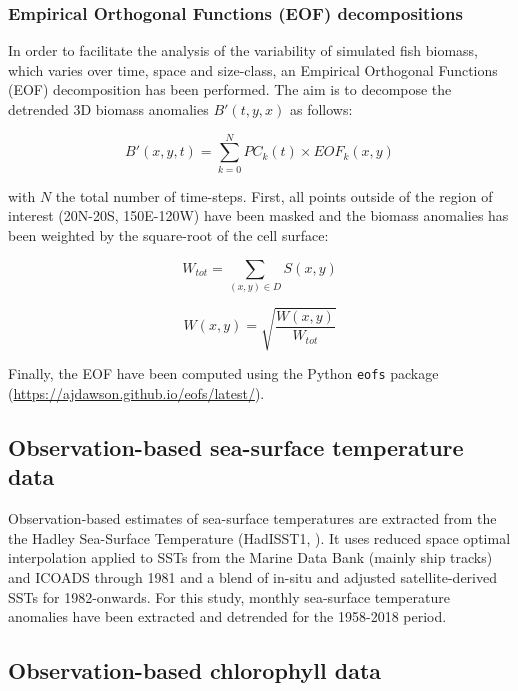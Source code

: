 \subsubsection{Empirical Orthogonal Functions (EOF) decompositions}
\label{sec:eof}

In order to facilitate the analysis of the variability of simulated fish biomass, which varies over time, space and size-class, an Empirical Orthogonal Functions (EOF) decomposition has been performed. The aim is to decompose the detrended 3D biomass anomalies $B'(t, y, x)$ as follows: 

\begin{equation}
B'(x,y,t) = \sum_{k=0}^{N} PC_k(t) \times EOF_k(x,y)
\end{equation}

with $N$ the total number of time-steps. First, all points outside of the region of interest (20N-20S, 150E-120W) have been masked and the biomass anomalies has been weighted by the square-root of the cell surface:

\begin{displaymath}
W_{tot} = \sum_{(x, y) \in D} S(x,y)
\end{displaymath}

\begin{displaymath}
W(x, y) = \sqrt{\frac{W(x, y)}{W_{tot}}}
\end{displaymath}

Finally, the EOF have been computed using the Python \verb+eofs+ package (\url{https://ajdawson.github.io/eofs/latest/}).

\subsection{Observation-based sea-surface temperature data}

Observation-based estimates of sea-surface temperatures are extracted from the the Hadley Sea-Surface Temperature (HadISST1, \citealt{raynerGlobalAnalysesSea2003}). It uses reduced space optimal interpolation applied to SSTs from the Marine Data Bank (mainly ship tracks) and ICOADS through 1981 and a blend of in-situ and adjusted satellite-derived SSTs for 1982-onwards. For this study, monthly sea-surface temperature anomalies have been extracted and detrended for the 1958-2018 period.

\subsection{Observation-based chlorophyll data}

